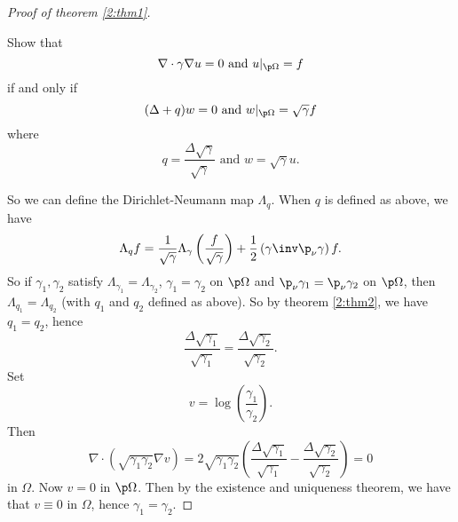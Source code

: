 \begin{proof}[Proof of theorem \ref{2:thm1}]
  \begin{exer}
    Show that
    \[ \nabla \cdot \gamma \nabla u = 0 \text{ and } u|_{\p\Omega} = f \]
    if and only if
    \[ (\Delta+q)w=0 \text{ and } w|_{\p\Omega}=\sqrt{\gamma}f \]
    where
    \[ q = \frac{\Delta\sqrt{\gamma}}{\sqrt{\gamma}} \text{ and } w=\sqrt{\gamma}u. \]
  \end{exer}

  So we can define the Dirichlet-Neumann map $\Lambda_q$.
  When $q$ is defined as above, we have
  \[ \Lambda_q f = \frac{1}{\sqrt{\gamma}} \Lambda_\gamma \left( \frac{f}{\sqrt{\gamma}} \right) + \frac{1}{2} \left( \gamma\inv \p_\nu \gamma \right) f. \]
  So if $\gamma_1,\gamma_2$ satisfy $\Lambda_{\gamma_1}=\Lambda_{\gamma_2}$, $\gamma_1=\gamma_2$ on $\p\Omega$ and $\p_\nu \gamma_1 = \p_\nu \gamma_2$ on $\p\Omega$, then $\Lambda_{q_1}=\Lambda_{q_2}$ (with $q_1$ and $q_2$ defined as above).
  So by theorem \ref{2:thm2}, we have $q_1=q_2$, hence
  \[ \frac{\Delta\sqrt{\gamma_1}}{\sqrt{\gamma_1}} = \frac{\Delta\sqrt{\gamma_2}}{\sqrt{\gamma_2}}. \]
  Set
  \[ v = \log \left(  \frac{\gamma_1}{\gamma_2} \right). \]
  Then
  \[ \nabla \cdot \left( \sqrt{\gamma_1\gamma_2} \nabla v \right) = 2 \sqrt{\gamma_1\gamma_2} \left( \frac{\Delta\sqrt{\gamma_1}}{\sqrt{\gamma_1}} - \frac{\Delta\sqrt{\gamma_2}}{\sqrt{\gamma_2}} \right) = 0 \]
  in $\Omega$.
  Now $v=0$ in $\p\Omega$.
  Then by the existence and uniqueness theorem, we have that $v \equiv 0$ in $\Omega$, hence $\gamma_1=\gamma_2$.
\end{proof}

